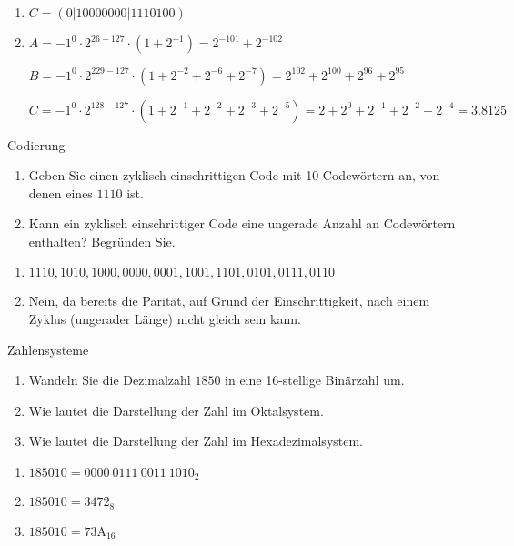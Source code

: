 \documentclass{article}
\begin{document}
\begin{solution}
  \begin{enumerate}
    \item $C = (0|10000000|1110100)$
    \item
          $A = {-1}^0 \cdot 2^{26-127} \cdot (1+2^{-1}) = 2^{-101} + 2^{-102}$\par
          $B = {-1}^0 \cdot 2^{229-127} \cdot (1+2^{-2}+2^{-6}+2^{-7}) = 2^{102} + 2^{100} + 2^{96} + 2^{95}$\par
          $C = {-1}^0 \cdot 2^{128-127} \cdot (1+2^{-1}+2^{-2}+2^{-3}+2^{-5}) = 2 + 2^0 + 2^{-1} + 2^{-2} + 2^{-4} = 3.8125$
  \end{enumerate}
\end{solution}

\begin{exercise}{Codierung}
  \begin{enumerate}
    \item Geben Sie einen zyklisch einschrittigen Code mit 10 Codewörtern an, von denen eines $1110$ ist.
    \item Kann ein zyklisch einschrittiger Code eine ungerade Anzahl an Codewörtern enthalten? Begründen Sie.
  \end{enumerate}
\end{exercise}

\begin{solution}
  \begin{enumerate}
    \item $1110, 1010, 1000, 0000, 0001, 1001, 1101, 0101, 0111, 0110$
    \item Nein, da bereits die Parität, auf Grund der Einschrittigkeit, nach einem Zyklus (ungerader Länge) nicht gleich sein kann.
  \end{enumerate}
\end{solution}

\begin{exercise}{Zahlensysteme}
  \begin{enumerate}
    \item Wandeln Sie die Dezimalzahl $1850$ in eine 16-stellige Binärzahl um.\points[4]
    \item Wie lautet die Darstellung der Zahl im Oktalsystem.\points
    \item Wie lautet die Darstellung der Zahl im Hexadezimalsystem.\points
  \end{enumerate}
\end{exercise}

\begin{solution}
  \begin{enumerate}
    \item $1850{10} = {0000\ 0111\ 0011\ 1010}_2$
    \item $1850{10} = {3472}_8$
    \item $1850{10} = {\mathrm{73A}}_{16}$
  \end{enumerate}
\end{solution}
\end{document}

